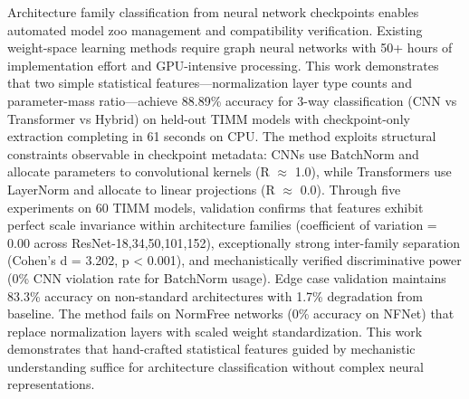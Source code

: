 
Architecture family classification from neural network checkpoints enables automated model zoo management and compatibility verification. Existing weight-space learning methods require graph neural networks with 50+ hours of implementation effort and GPU-intensive processing. This work demonstrates that two simple statistical features---normalization layer type counts and parameter-mass ratio---achieve 88.89\% accuracy for 3-way classification (CNN vs Transformer vs Hybrid) on held-out TIMM models with checkpoint-only extraction completing in 61 seconds on CPU. The method exploits structural constraints observable in checkpoint metadata: CNNs use BatchNorm and allocate parameters to convolutional kernels (R $\approx$ 1.0), while Transformers use LayerNorm and allocate to linear projections (R $\approx$ 0.0). Through five experiments on 60 TIMM models, validation confirms that features exhibit perfect scale invariance within architecture families (coefficient of variation = 0.00 across ResNet-{18,34,50,101,152}), exceptionally strong inter-family separation (Cohen's d = 3.202, p < 0.001), and mechanistically verified discriminative power (0\% CNN violation rate for BatchNorm usage). Edge case validation maintains 83.3\% accuracy on non-standard architectures with 1.7\% degradation from baseline. The method fails on NormFree networks (0\% accuracy on NFNet) that replace normalization layers with scaled weight standardization. This work demonstrates that hand-crafted statistical features guided by mechanistic understanding suffice for architecture classification without complex neural representations.
